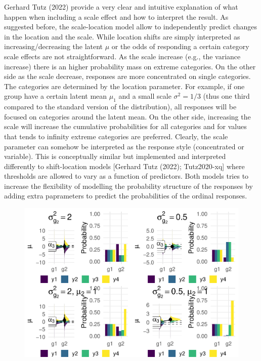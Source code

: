 \documentclass[
  man,floatsintext]{apa6}
\begin{document}
Gerhard Tutz (2022) provide a very clear and intuitive explanation of what happen when including a scale effect and how to interpret the result. As suggested before, the scale-location model allow to independently predict changes in the location and the scale. While location shifts are simply interpreted as increasing/decreasing the latent \(\mu\) or the odds of responding a certain category scale effects are not straightforward. As the scale increase (e.g., the variance increase) there is an higher probability mass on extreme categories. On the other side as the scale decrease, responses are more concentrated on single categories. The categories are determined by the location parameter. For example, if one group have a certain latent mean \(\mu_1\) and a small scale \(\sigma^2 = 1/3\) (thus one third compared to the standard version of the distribution), all responses will be focused on categories around the latent mean. On the other side, increasing the scale will increase the cumulative probabilities for all categories and for values that tends to infinity extreme categories are preferred. Clearly, the scale parameter can somehow be interpreted as the response style (concentrated or variable). This is conceptually similar but implemented and interpreted differently to shift-location models {[}Gerhard Tutz (2022); Tutz2020-xq{]} where thresholds are allowed to vary as a function of predictors. Both models tries to increase the flexibility of modelling the probability structure of the responses by adding extra paprameters to predict the probabilities of the ordinal responses.

\scriptsize

\begin{figure}

{\centering \includegraphics{paper-new_files/figure-latex/unnamed-chunk-17-1} 

}

\caption{ }\label{fig:unnamed-chunk-17}
\end{figure}
\end{document}
